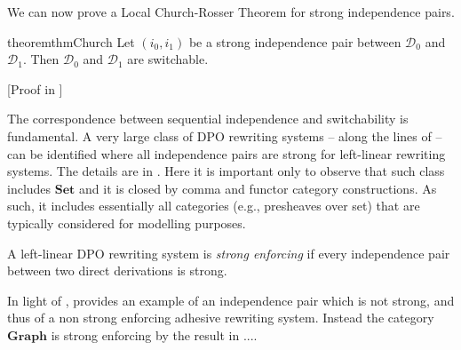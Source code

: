 \documentclass[a4paper,UKenglish,cleveref,pdftex,thm-restate,numberwithinsect,anonymous]{lipics}
\newcommand{\cat}[1]{\ensuremath{\mathbf{#1}}}
\newcommand{\dder}[1]{\mathscr{#1}}
\newcommand{\rem}[2]{{\color{blue}#1}{\color{red}#2}}
\renewcommand{\rem}[2]{}
\begin{document}


We can now prove a Local Church-Rosser Theorem for strong independence pairs.


\begin{restatable}{theorem}{thmChurch}
  \label{thm:church}
  Let $(i_0, i_1)$ be a strong independence pair
  between $\dder{D}_0$ and $\dder{D}_1$. Then $\dder{D}_0$ and
  $\dder{D}_1$ are switchable.
\end{restatable}
[Proof in ]

The correspondence between sequential independence and switchability
is fundamental.  A very large class of DPO rewriting systems -- along the
lines of \cite{baldan2011adhesivity} -- can be identified where all
independence pairs are strong for left-linear rewriting systems. The details are in 
. Here it is important only to observe that such class includes $\cat{Set}$ and it is closed by comma and functor category constructions. 
As such, it includes essentially all categories (e.g., presheaves over set) that are typically considered for modelling purposes.



\begin{definition}A left-linear DPO rewriting system is \emph{strong enforcing} if every independence pair between two direct derivations is strong.
\end{definition}

\begin{example}
  \label{ex:diff2}
  In light of ,  provides an example
  of an independence pair which is not strong, and thus of a non strong enforcing
  adhesive rewriting system. Instead the category $\cat{Graph}$ is
  strong enforcing by the result in ....
\end{example}
\end{document}
